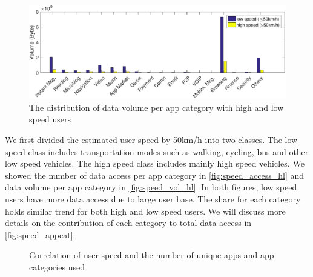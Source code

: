 \begin{figure}[h]
    \centering
    \includegraphics[width=\linewidth]{./figures/volume_high_low_speed_8_6.pdf}
    \caption{The distribution of data volume per app category with high and low speed users}
    \label{fig:speed_vol_hl}
\end{figure}

We first divided the estimated user speed by 50km/h into two classes. The low speed class includes transportation modes such as walking, cycling, bus and other low speed vehicles. The high speed class includes mainly high speed vehicles. We showed the number of data access per app category in \autoref{fig:speed_access_hl} and data volume per app category in \autoref{fig:speed_vol_hl}. In both figures, low speed users have more data access due to large user base. The share for each category holds similar trend for both high and low speed users. We will discuss more details on the contribution of each category to total data access in \autoref{fig:speed_appcat}.

\begin{figure}
    \centering
    \caption{Correlation of user speed and the number of unique apps and app categories used}
    \label{fig:speed_app_used}
\end{figure}

